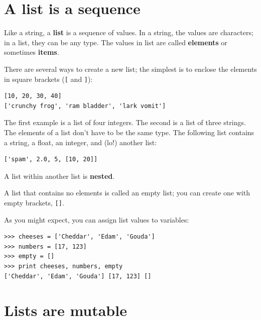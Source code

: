 \documentclass[10pt]{book}
\begin{document}
\section{A list is a sequence}

Like a string, a {\bf list} is a sequence of values.  In a string, the
values are characters; in a list, they can be any type.  The values in
list are called {\bf elements} or sometimes {\bf items}.


There are several ways to create a new list; the simplest is to
enclose the elements in square brackets (\verb"[" and \verb"]"):

\beforeverb
\begin{verbatim}
[10, 20, 30, 40]
['crunchy frog', 'ram bladder', 'lark vomit']
\end{verbatim}
\afterverb
%
The first example is a list of four integers.  The second is a list of
three strings.  The elements of a list don't have to be the same type.
The following list contains a string, a float, an integer, and
(lo!) another list:

\beforeverb
\begin{verbatim}
['spam', 2.0, 5, [10, 20]]
\end{verbatim}
\afterverb
%
A list within another list is {\bf nested}.


A list that contains no elements is
called an empty list; you can create one with empty
brackets, \verb"[]".


As you might expect, you can assign list values to variables:

\beforeverb
\begin{verbatim}
>>> cheeses = ['Cheddar', 'Edam', 'Gouda']
>>> numbers = [17, 123]
>>> empty = []
>>> print cheeses, numbers, empty
['Cheddar', 'Edam', 'Gouda'] [17, 123] []
\end{verbatim}
\afterverb
%




\section{Lists are mutable}

\end{document}
